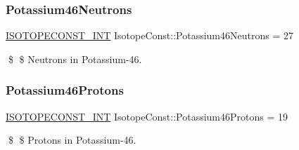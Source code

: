 \subsubsection{\texorpdfstring{Potassium46\+Neutrons}{Potassium46Neutrons}}
{\footnotesize\ttfamily \mbox{\hyperlink{group___isotope_const-_macros_ga5f18360b3e99483a35c32d789e62621c}{I\+S\+O\+T\+O\+P\+E\+C\+O\+N\+S\+T\+\_\+\+I\+NT}} Isotope\+Const\+::\+Potassium46\+Neutrons = 27}

\$ \$ Neutrons in Potassium-\/46. \mbox{\label{group___isotope_const-_potassium-_k46_ga08b046994b672aabffa60455dfa48636}} 
\subsubsection{\texorpdfstring{Potassium46\+Protons}{Potassium46Protons}}
{\footnotesize\ttfamily \mbox{\hyperlink{group___isotope_const-_macros_ga5f18360b3e99483a35c32d789e62621c}{I\+S\+O\+T\+O\+P\+E\+C\+O\+N\+S\+T\+\_\+\+I\+NT}} Isotope\+Const\+::\+Potassium46\+Protons = 19}

\$ \$ Protons in Potassium-\/46. 